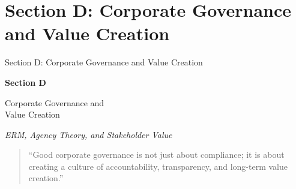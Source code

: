 \documentclass[aspectratio=169]{beamer}
\begin{document}
	\section{Section D: Corporate Governance and Value Creation}
	
	\begin{frame}{Section D: Corporate Governance and Value Creation}
		\begin{center}
			\Huge\textcolor{navyblue}{\textbf{Section D}}
			\vspace{0.5cm}
			
			\huge Corporate Governance and \\
			Value Creation
			\vspace{0.3cm}
			
			\large\textit{ERM, Agency Theory, and Stakeholder Value}
			\vspace{0.5cm}
			
			\begin{quotation}
				\small ``Good corporate governance is not just about compliance; it is about creating a culture of accountability, transparency, and long-term value creation.''
			\end{quotation}
		\end{center}
	\end{frame}
	
\end{document}
